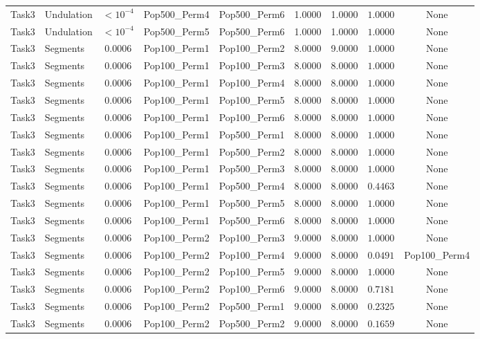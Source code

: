 \documentclass[8pt]{article}
\begin{document}
\begin{longtable}{llccccccc}
Task3 & Undulation & $< 10^{-4}$ & Pop500\_Perm4 & Pop500\_Perm6 & 1.0000 & 1.0000 & $1.0000$ & None \\
Task3 & Undulation & $< 10^{-4}$ & Pop500\_Perm5 & Pop500\_Perm6 & 1.0000 & 1.0000 & $1.0000$ & None \\
Task3 & Segments & $0.0006$ & Pop100\_Perm1 & Pop100\_Perm2 & 8.0000 & 9.0000 & $1.0000$ & None \\
Task3 & Segments & $0.0006$ & Pop100\_Perm1 & Pop100\_Perm3 & 8.0000 & 8.0000 & $1.0000$ & None \\
Task3 & Segments & $0.0006$ & Pop100\_Perm1 & Pop100\_Perm4 & 8.0000 & 8.0000 & $1.0000$ & None \\
Task3 & Segments & $0.0006$ & Pop100\_Perm1 & Pop100\_Perm5 & 8.0000 & 8.0000 & $1.0000$ & None \\
Task3 & Segments & $0.0006$ & Pop100\_Perm1 & Pop100\_Perm6 & 8.0000 & 8.0000 & $1.0000$ & None \\
Task3 & Segments & $0.0006$ & Pop100\_Perm1 & Pop500\_Perm1 & 8.0000 & 8.0000 & $1.0000$ & None \\
Task3 & Segments & $0.0006$ & Pop100\_Perm1 & Pop500\_Perm2 & 8.0000 & 8.0000 & $1.0000$ & None \\
Task3 & Segments & $0.0006$ & Pop100\_Perm1 & Pop500\_Perm3 & 8.0000 & 8.0000 & $1.0000$ & None \\
Task3 & Segments & $0.0006$ & Pop100\_Perm1 & Pop500\_Perm4 & 8.0000 & 8.0000 & $0.4463$ & None \\
Task3 & Segments & $0.0006$ & Pop100\_Perm1 & Pop500\_Perm5 & 8.0000 & 8.0000 & $1.0000$ & None \\
Task3 & Segments & $0.0006$ & Pop100\_Perm1 & Pop500\_Perm6 & 8.0000 & 8.0000 & $1.0000$ & None \\
Task3 & Segments & $0.0006$ & Pop100\_Perm2 & Pop100\_Perm3 & 9.0000 & 8.0000 & $1.0000$ & None \\
Task3 & Segments & $0.0006$ & Pop100\_Perm2 & Pop100\_Perm4 & 9.0000 & 8.0000 & $0.0491$ & Pop100\_Perm4 \\
Task3 & Segments & $0.0006$ & Pop100\_Perm2 & Pop100\_Perm5 & 9.0000 & 8.0000 & $1.0000$ & None \\
Task3 & Segments & $0.0006$ & Pop100\_Perm2 & Pop100\_Perm6 & 9.0000 & 8.0000 & $0.7181$ & None \\
Task3 & Segments & $0.0006$ & Pop100\_Perm2 & Pop500\_Perm1 & 9.0000 & 8.0000 & $0.2325$ & None \\
Task3 & Segments & $0.0006$ & Pop100\_Perm2 & Pop500\_Perm2 & 9.0000 & 8.0000 & $0.1659$ & None \\

\end{longtable}
\end{document}
